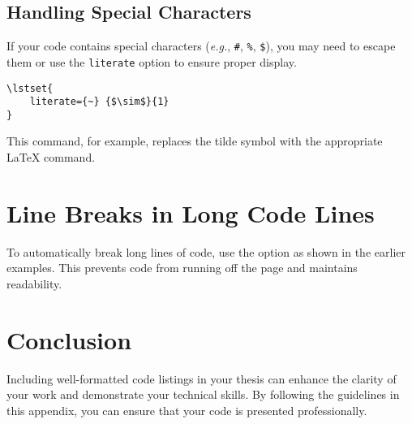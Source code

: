 		\subsection{Handling Special Characters}
			If your code contains special characters (\textit{e.g.}, \texttt{\#}, \texttt{\%}, \texttt{\$}), you may need to escape them or use the \texttt{literate} option to ensure proper display.

			\begin{lstlisting}[style=LaTeXStyle]
\lstset{
	literate={~} {$\sim$}{1}
}
			\end{lstlisting}

			This command, for example, replaces the tilde symbol with the appropriate LaTeX command.


	\section{Line Breaks in Long Code Lines}

		To automatically break long lines of code, use the  option as shown in the earlier examples. 
		This prevents code from running off the page and maintains readability.

	\section{Conclusion}

		Including well-formatted code listings in your thesis can enhance the clarity of your work and demonstrate your technical skills. 
		By following the guidelines in this appendix, you can ensure that your code is presented professionally.

